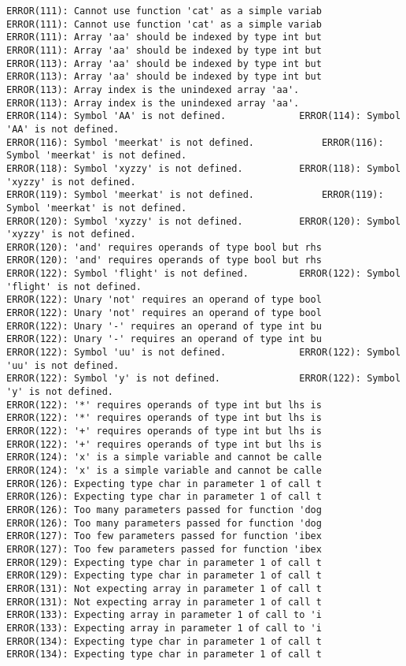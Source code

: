 \documentclass[12pt]{book}
\begin{document}
\begin{lstlisting}
ERROR(111): Cannot use function 'cat' as a simple variab	ERROR(111): Cannot use function 'cat' as a simple variab
ERROR(111): Array 'aa' should be indexed by type int but	ERROR(111): Array 'aa' should be indexed by type int but
ERROR(113): Array 'aa' should be indexed by type int but	ERROR(113): Array 'aa' should be indexed by type int but
ERROR(113): Array index is the unindexed array 'aa'.		ERROR(113): Array index is the unindexed array 'aa'.
ERROR(114): Symbol 'AA' is not defined.				ERROR(114): Symbol 'AA' is not defined.
ERROR(116): Symbol 'meerkat' is not defined.			ERROR(116): Symbol 'meerkat' is not defined.
ERROR(118): Symbol 'xyzzy' is not defined.			ERROR(118): Symbol 'xyzzy' is not defined.
ERROR(119): Symbol 'meerkat' is not defined.			ERROR(119): Symbol 'meerkat' is not defined.
ERROR(120): Symbol 'xyzzy' is not defined.			ERROR(120): Symbol 'xyzzy' is not defined.
ERROR(120): 'and' requires operands of type bool but rhs	ERROR(120): 'and' requires operands of type bool but rhs
ERROR(122): Symbol 'flight' is not defined.			ERROR(122): Symbol 'flight' is not defined.
ERROR(122): Unary 'not' requires an operand of type bool	ERROR(122): Unary 'not' requires an operand of type bool
ERROR(122): Unary '-' requires an operand of type int bu	ERROR(122): Unary '-' requires an operand of type int bu
ERROR(122): Symbol 'uu' is not defined.				ERROR(122): Symbol 'uu' is not defined.
ERROR(122): Symbol 'y' is not defined.				ERROR(122): Symbol 'y' is not defined.
ERROR(122): '*' requires operands of type int but lhs is	ERROR(122): '*' requires operands of type int but lhs is
ERROR(122): '+' requires operands of type int but lhs is	ERROR(122): '+' requires operands of type int but lhs is
ERROR(124): 'x' is a simple variable and cannot be calle	ERROR(124): 'x' is a simple variable and cannot be calle
ERROR(126): Expecting type char in parameter 1 of call t	ERROR(126): Expecting type char in parameter 1 of call t
ERROR(126): Too many parameters passed for function 'dog	ERROR(126): Too many parameters passed for function 'dog
ERROR(127): Too few parameters passed for function 'ibex	ERROR(127): Too few parameters passed for function 'ibex
ERROR(129): Expecting type char in parameter 1 of call t	ERROR(129): Expecting type char in parameter 1 of call t
ERROR(131): Not expecting array in parameter 1 of call t	ERROR(131): Not expecting array in parameter 1 of call t
ERROR(133): Expecting array in parameter 1 of call to 'i	ERROR(133): Expecting array in parameter 1 of call to 'i
ERROR(134): Expecting type char in parameter 1 of call t	ERROR(134): Expecting type char in parameter 1 of call t

\end{lstlisting}
\end{document}

